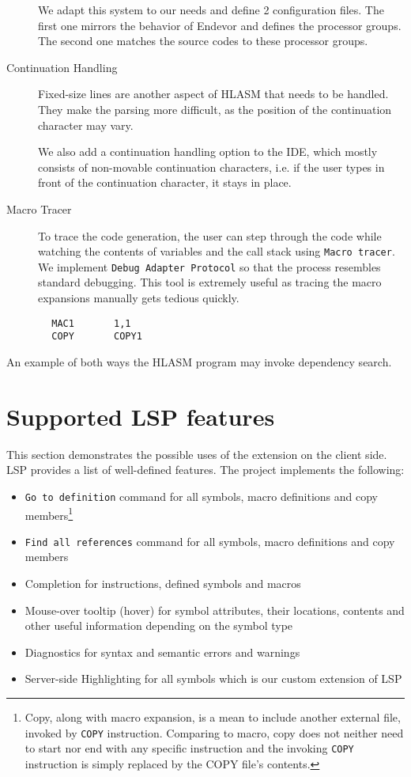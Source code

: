 \begin{description}
We adapt this system to our needs and define 2 configuration files. The first one mirrors the behavior of Endevor and defines the processor groups. The second one matches the source codes to these processor groups.

\item [Continuation Handling] Fixed-size lines are another aspect of HLASM that needs to be handled. They make the parsing more difficult, as the position of the continuation character may vary. 

We also add a continuation handling option to the IDE, which mostly consists of non-movable continuation characters, i.e. if the user types in front of the continuation character, it stays in place.

\item [Macro Tracer] To trace the code generation, the user can step through the code while watching the contents of variables and the call stack using \texttt{Macro tracer}. We implement \texttt{Debug Adapter Protocol} so that the process resembles standard debugging. This tool is extremely useful as tracing the macro expansions manually gets tedious quickly.
\end{description}

\pagebreak
\begin{listing}
\begin{verbatim}
        MAC1       1,1                   
        COPY       COPY1
\end{verbatim} 
\caption{An example of both ways the HLASM program may invoke dependency search.}
\label{lst:search}
\end{listing}

\section{Supported LSP features}
This section demonstrates the possible uses of the extension on the client side. LSP provides a list of well-defined features. The project implements the following:

\begin{itemize}
	\item \texttt{Go to definition} command for all symbols, macro definitions and copy members\footnote{Copy, along with macro expansion, is a mean to include another external file, invoked by \texttt{COPY} instruction. Comparing to macro, copy does not neither need to start nor end with any specific instruction and the invoking \texttt{COPY} instruction is simply replaced by the COPY file's contents.}
	\item \texttt{Find all references} command for all symbols, macro definitions and copy members
	\item Completion for instructions, defined symbols and macros
	\item Mouse-over tooltip (hover) for symbol attributes, their locations, contents and other useful information depending on the symbol type
	\item Diagnostics for syntax and semantic errors and warnings
	\item Server-side Highlighting for all symbols which is our custom extension of LSP  
\end{itemize}

